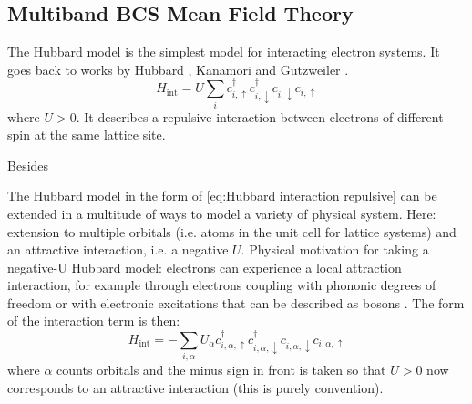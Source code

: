 \documentclass[../notes.tex]{subfiles}
\begin{document}

\subsection*{Multiband BCS Mean Field Theory}\label{ssec:Multiband BCS Mean Field Theory}

The Hubbard model is the simplest model for interacting electron systems.
It goes back to works by Hubbard \cite{hubbardElectronCorrelationsNarrow1963}, Kanamori \cite{kanamoriElectronCorrelationFerromagnetism1963} and Gutzweiler \cite{gutzwillerEffectCorrelationFerromagnetism1963}.
\begin{equation}
	H_{\mathrm{int}} = U \sum_{i} c_{i, \uparrow}^{\dagger} c_{i, \downarrow}^{\dagger} c_{i, \downarrow} c_{i, \uparrow}
	\label{eq:Hubbard interaction repulsive}
\end{equation}
where \(U > 0\).
It describes a repulsive interaction between electrons of different spin at the same lattice site.


Besides 

\cite{qinHubbardModelComputational2022}


The Hubbard model  in the form of \cref{eq:Hubbard interaction repulsive} can be extended in a multitude of ways to model a variety of physical system.
Here: extension to multiple orbitals (i.e. atoms in the unit cell for lattice systems) and an attractive interaction, i.e. a negative \(U\).
Physical motivation for taking a negative-U Hubbard model: electrons can experience a local attraction interaction, for example through electrons coupling with phononic degrees of freedom or with electronic excitations that can be described as bosons \cite{micnasSuperconductivityNarrowbandSystems1990}.
The form of the interaction term is then: 
\begin{equation}
	H_{\mathrm{int}} = -\sum_{i, \alpha} U_{\alpha} c_{i, \alpha, \uparrow}^{\dagger} c_{i, \alpha, \downarrow}^{\dagger} c_{i, \alpha, \downarrow} c_{i, \alpha, \uparrow}
	\label{eq:Hubbard interaction multiband}
\end{equation}
where \(\alpha\) counts orbitals and the minus sign in front is taken so that \(U > 0\) now corresponds to an attractive interaction (this is purely convention).
\end{document}
